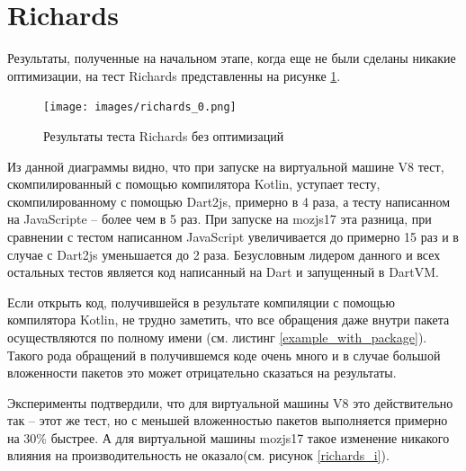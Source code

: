 \section{Richards}

Результаты, полученные на начальном этапе, когда еще не были сделаны никакие оптимизации, на тест Richards представленны на рисунке \ref{richards_0}.

\begin{figure}[ht!]
\centering
\texttt{[image: images/richards\_0.png]}
\caption{Результаты теста Richards без оптимизаций}
\label{richards_0}
\end{figure}

Из данной диаграммы видно, что при запуске на виртуальной машине V8 тест, скомпилированный с помощью компилятора Kotlin, уступает тесту, скомпилированному с помощью Dart2js, примерно в 4 раза, а тесту написанном на JavaScripte -- более чем в 5 раз. При запуске на mozjs17 эта разница, при сравнении с тестом написанном JavaScript увеличивается до примерно 15 раз и в случае с Dart2js уменьшается до 2 раза. Безусловным лидером данного и всех остальных тестов является код написанный на Dart и запущенный в DartVM.

Если открыть код, получившейся в результате компиляции с помощью компилятора Kotlin, не трудно заметить, что все обращения даже внутри пакета осуществляются по полному имени (см. листинг \ref{example_with_package}). Такого рода обращений в получившемся коде очень много и в случае большой вложенности пакетов это может отрицательно сказаться на результаты. 

\begin{code}
\begin{JavaScript}[caption=Пример код с обращением по полному имени внутри того же пакета, label=example_with_package]
...
_ = {
org: Kotlin.definePackage({
  jetbrains: Kotlin.definePackage({
    kotlin: Kotlin.definePackage({
      benchmarks: Kotlin.definePackage({
        Richards_from_darts: Kotlin.definePackage({
          js: Kotlin.definePackage({
            //...
            addIdleTask: function (id, priority, queue, count) {
            this.addRunningTask(id, priority, queue, new _.org.jetbrains.kotlin.benchmarks.Richards.js.IdleTask(this, 1, count));
            }
            //...
\end{JavaScript}
\end{code}

Эксперименты подтвердили, что для виртуальной машины V8 это действительно так -- этот же тест, но с меньшей вложенностью пакетов выполняется примерно на 30\% быстрее. А для виртуальной машины mozjs17 такое изменение никакого влияния на производительность не оказало(см. рисунок \ref{richards_i}).

